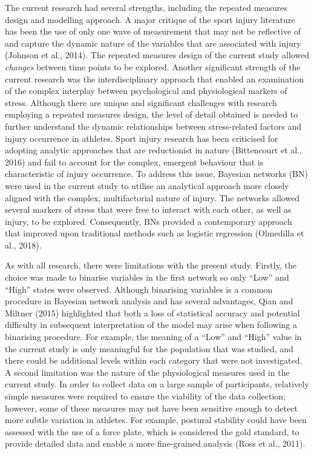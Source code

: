 \documentclass[man,floatsintext]{apa6}
\begin{document}
The current research had several strengths, including the repeated measures design and modelling approach.
A major critique of the sport injury literature has been the use of only one wave of measurement that may not be reflective of and capture the dynamic nature of the variables that are associated with injury (Johnson et al., 2014).
The repeated measures design of the current study allowed \emph{changes} between time points to be explored.
Another significant strength of the current research was the interdisciplinary approach that enabled an examination of the complex interplay between psychological and physiological markers of stress.
Although there are unique and significant challenges with research employing a repeated measures design, the level of detail obtained is needed to further understand the dynamic relationships between stress-related factors and injury occurrence in athletes.
Sport injury research has been criticised for adopting analytic approaches that are reductionist in nature (Bittencourt et al., 2016) and fail to account for the complex, emergent behaviour that is characteristic of injury occurrence.
To address this issue, Bayesian networks (BN) were used in the current study to utilise an analytical approach more closely aligned with the complex, multifactorial nature of injury.
The networks allowed several markers of stress that were free to interact with each other, as well as injury, to be explored.
Consequently, BNs provided a contemporary approach that improved upon traditional methods such as logistic regression (Olmedilla et al., 2018).

As with all research, there were limitations with the present study.
Firstly, the choice was made to binarise variables in the first network so only \enquote{Low} and \enquote{High} states were observed.
Although binarising variables is a common procedure in Bayesian network analysis and has several advantages, Qian and Miltner (2015) highlighted that both a loss of statistical accuracy and potential difficulty in subsequent interpretation of the model may arise when following a binarising procedure.
For example, the meaning of a \enquote{Low} and \enquote{High} value in the current study is only meaningful for the population that was studied, and there could be additional levels within each category that were not investigated.
A second limitation was the nature of the physiological measures used in the current study.
In order to collect data on a large sample of participants, relatively simple measures were required to ensure the viability of the data collection; however, some of these measures may not have been sensitive enough to detect more subtle variation in athletes.
For example, postural stability could have been assessed with the use of a force plate, which is considered the gold standard, to provide detailed data and enable a more fine-grained analysis (Ross et al., 2011).
\end{document}
